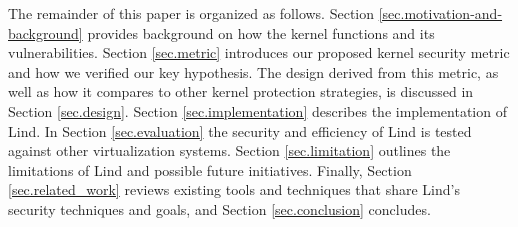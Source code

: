 The remainder of this paper is organized as follows.
Section \ref{sec.motivation-and-background} provides background on
how the kernel functions and its vulnerabilities.
Section \ref{sec.metric} introduces our proposed kernel security metric and how
we verified our key hypothesis. The
design derived from this metric, as well as how it compares to other kernel
protection strategies,
is discussed in Section \ref{sec.design}. Section \ref{sec.implementation}
describes the implementation of Lind. In Section \ref{sec.evaluation} the security and
efficiency of Lind is tested against other virtualization systems.
Section \ref{sec.limitation} outlines the 
limitations of Lind and possible future initiatives.
Finally, Section \ref{sec.related_work} reviews existing tools and techniques that share
Lind's security techniques and goals, and Section \ref{sec.conclusion} concludes.






